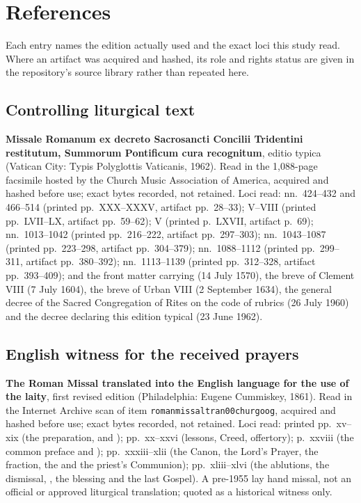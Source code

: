 \section{References}

Each entry names the edition actually used and the exact loci this study read.
Where an artifact was acquired and hashed, its role and rights status are given
in the repository's source library rather than repeated here.

\subsection*{Controlling liturgical text}

\textbf{Missale Romanum ex decreto Sacrosancti Concilii Tridentini
restitutum, Summorum Pontificum cura recognitum}, editio typica (Vatican City:
Typis Polyglottis Vaticanis, 1962). Read in the 1{,}088-page facsimile hosted
by the Church Music Association of America, acquired and hashed before use;
exact bytes recorded, not retained. Loci read:  nn.~424--432 and 466--514 (printed pp.~XXX--XXXV, artifact
pp.~28--33);  V--VIII (printed
pp.~LVII--LX, artifact pp.~59--62);  V (printed p.~LXVII,
artifact p.~69);  nn.~1013--1042 (printed pp.~216--222,
artifact pp.~297--303);  nn.~1043--1087 (printed
pp.~223--298, artifact pp.~304--379);  nn.~1088--1112
(printed pp.~299--311, artifact pp.~380--392); 
nn.~1113--1139 (printed pp.~312--328, artifact pp.~393--409); and the front
matter carrying  (14 July 1570), the breve of Clement VIII
(7 July 1604), the breve of Urban VIII (2 September 1634), the general decree
of the Sacred Congregation of Rites on the code of rubrics (26 July 1960) and
the decree declaring this edition typical (23 June 1962).

\subsection*{English witness for the received prayers}

\textbf{The Roman Missal translated into the English language for the use of
the laity}, first revised edition (Philadelphia: Eugene Cummiskey, 1861). Read
in the Internet Archive scan of item \texttt{romanmissaltran00churgoog},
acquired and hashed before use; exact bytes recorded, not retained. Loci read:
printed pp.~xv--xix (the preparation,  and );
pp.~xx--xxvi (lessons, Creed, offertory); p.~xxviii (the common preface and
); pp.~xxxiii--xlii (the Canon, the Lord's Prayer, the
fraction, the  and the priest's Communion);
pp.~xliii--xlvi (the ablutions, the dismissal, , the blessing
and the last Gospel). A pre-1955 lay hand missal, not an official or approved
liturgical translation; quoted as a historical witness only.

